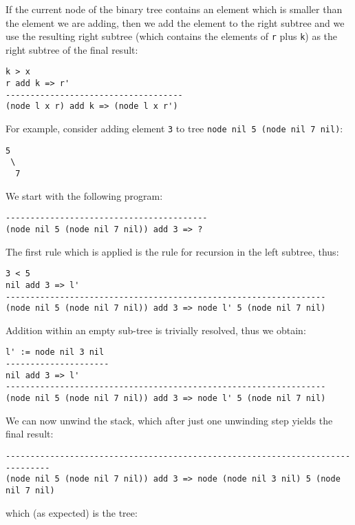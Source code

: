 If the current node of the binary tree contains an element which is smaller than the element we are adding, then we add the element to the right subtree and we use the resulting right subtree (which contains the elements of \texttt{r} plus \texttt{k}) as the right subtree of the final result:

\begin{lstlisting}
k > x
r add k => r'
------------------------------------
(node l x r) add k => (node l x r')
\end{lstlisting}


For example, consider adding element \texttt{3} to tree \texttt{node nil 5 (node nil 7 nil)}:

\begin{lstlisting}
5
 \
  7
\end{lstlisting}

We start with the following program:

\begin{lstlisting}
-----------------------------------------
(node nil 5 (node nil 7 nil)) add 3 => ?
\end{lstlisting}

The first rule which is applied is the rule for recursion in the left subtree, thus:

\begin{lstlisting}
3 < 5
nil add 3 => l'
-----------------------------------------------------------------
(node nil 5 (node nil 7 nil)) add 3 => node l' 5 (node nil 7 nil)
\end{lstlisting}

Addition within an empty sub-tree is trivially resolved, thus we obtain:

\begin{lstlisting}
l' := node nil 3 nil
---------------------
nil add 3 => l'
-----------------------------------------------------------------
(node nil 5 (node nil 7 nil)) add 3 => node l' 5 (node nil 7 nil)
\end{lstlisting}

We can now unwind the stack, which after just one unwinding step yields the final result:

\begin{lstlisting}
-------------------------------------------------------------------------------
(node nil 5 (node nil 7 nil)) add 3 => node (node nil 3 nil) 5 (node nil 7 nil)
\end{lstlisting}

which (as expected) is the tree:

